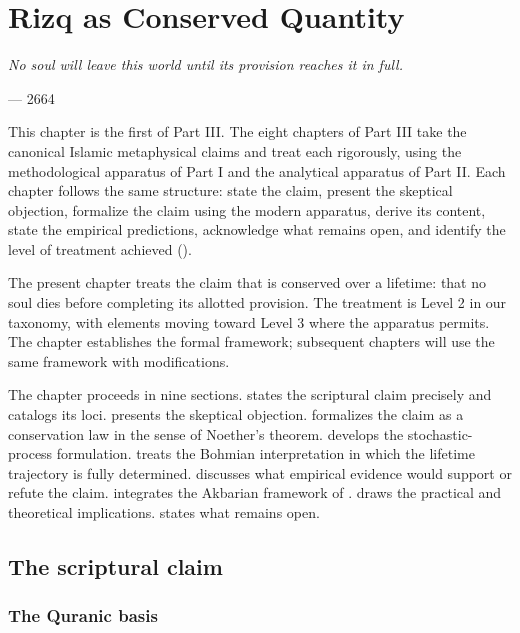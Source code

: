 \chapter{Rizq as Conserved Quantity}
\label{ch:rizq-conservation}

\epigraph{\itshape No soul will leave this world until its provision
reaches it in full.}{---  2664}

\noindent
This chapter is the first of Part III. The eight chapters of Part III
take the canonical Islamic metaphysical claims and treat each
rigorously, using the methodological apparatus of Part I and the
analytical apparatus of Part II. Each chapter follows the same
structure: state the claim, present the skeptical objection,
formalize the claim using the modern apparatus, derive its content,
state the empirical predictions, acknowledge what remains open, and
identify the level of treatment achieved ().

The present chapter treats the claim that  is conserved
over a lifetime: that no soul dies before completing its allotted
provision. The treatment is Level 2 in our taxonomy, with elements
moving toward Level 3 where the apparatus permits. The chapter
establishes the formal framework; subsequent chapters will use the
same framework with modifications.

The chapter proceeds in nine sections.
 states the scriptural claim precisely and
catalogs its loci.
 presents the skeptical objection.
 formalizes the claim as a conservation
law in the sense of Noether's theorem.
 develops the stochastic-process formulation.
 treats the Bohmian interpretation in which
the lifetime trajectory is fully determined.
 discusses what empirical evidence
would support or refute the claim.
 integrates the Akbarian framework of
.
 draws the practical and theoretical
implications.
 states what remains open.

\section{The scriptural claim}
\label{sec:rizq-claim}

\subsection{The Quranic basis}


